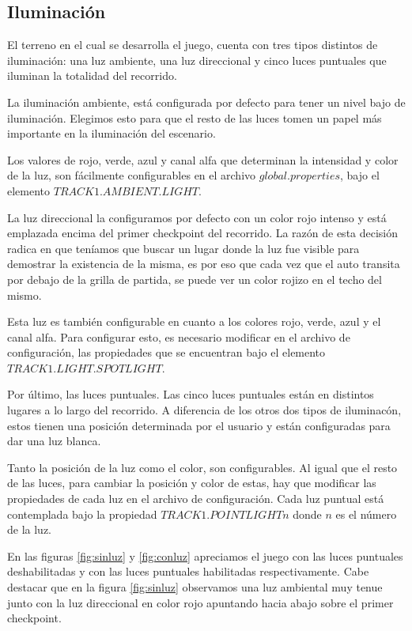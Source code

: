 \documentclass[a4paper,10pt]{article}
\begin{document}
\subsection{Iluminaci\'on}

El terreno en el cual se desarrolla el juego, cuenta con tres tipos distintos de
iluminaci\'on: una luz ambiente, una luz direccional y cinco luces puntuales que
iluminan la totalidad del recorrido.

La iluminaci\'on ambiente, est\'a configurada por defecto para tener un nivel
bajo de iluminaci\'on.  Elegimos esto para que el resto de las luces tomen un
papel m\'as importante en la iluminaci\'on del escenario.

Los valores de rojo, verde, azul y canal alfa que determinan la intensidad y
color de la luz, son f\'acilmente configurables en el archivo
$global.properties$, bajo el elemento $TRACK1.AMBIENT.LIGHT$.

La luz direccional la configuramos por defecto con un color rojo intenso y
est\'a emplazada encima del primer checkpoint del recorrido. La raz\'on de esta
decisi\'on radica en que ten\'iamos que buscar un lugar donde la luz fue
visible para demostrar la existencia de la misma, es por eso que cada vez que
el auto transita por debajo de la grilla de partida, se puede ver un color
rojizo en el techo del mismo.

Esta luz es tambi\'en configurable en cuanto a los colores rojo, verde, azul y
el canal alfa.  Para configurar esto, es necesario modificar en el archivo de
configuraci\'on, las propiedades que se encuentran bajo el elemento
$TRACK1.LIGHT.SPOTLIGHT$.

Por \'ultimo, las luces puntuales.  Las cinco luces puntuales est\'an en
distintos lugares a lo largo del recorrido.  A diferencia de los otros dos
tipos de iluminac\'on, estos tienen una posici\'on determinada por el usuario y
est\'an configuradas para dar una luz blanca.

Tanto la posici\'on de la luz como el color, son configurables.  Al igual que
el resto de las luces, para cambiar la posici\'on y color de estas, hay que
modificar las propiedades de cada luz en el archivo de configuraci\'on.  Cada
luz puntual est\'a contemplada bajo la propiedad $TRACK1.POINTLIGHTn$ donde $n$
es el n\'umero de la luz.

En las figuras \ref{fig:sinluz} y \ref{fig:conluz} apreciamos el juego
con las luces puntuales deshabilitadas y con las luces puntuales habilitadas
respectivamente.  Cabe destacar que en la figura \ref{fig:sinluz} observamos una
luz ambiental muy tenue junto con la luz direccional en color
rojo apuntando hacia abajo sobre el primer checkpoint.
\end{document}

